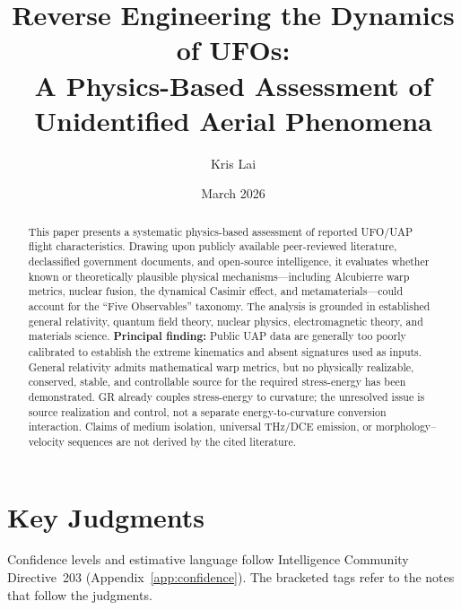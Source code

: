 \documentclass[aps,prd,twocolumn,superscriptaddress,nofootinbib,floatfix]{revtex4-2}
\begin{document}
\title{Reverse Engineering the Dynamics of UFOs:\texorpdfstring{\\}{ }
A Physics-Based Assessment of Unidentified Aerial Phenomena}

\author{Kris Lai}

\date{March 2026}

\begin{abstract}
This paper presents a systematic physics-based assessment of reported UFO/UAP
flight characteristics. Drawing upon publicly available peer-reviewed literature,
declassified government documents, and open-source intelligence, it evaluates
whether known or theoretically plausible physical mechanisms---including
Alcubierre warp metrics, nuclear fusion, the dynamical Casimir effect, and
metamaterials---could account for the ``Five Observables'' taxonomy. The analysis
is grounded in established general relativity, quantum field theory, nuclear
physics, electromagnetic theory, and materials science.
\textbf{Principal finding:} Public UAP data are generally too poorly calibrated to
establish the extreme kinematics and absent signatures used as inputs. General
relativity admits mathematical warp metrics, but no physically realizable,
conserved, stable, and controllable source for the required stress-energy has
been demonstrated. GR already couples stress-energy to curvature; the unresolved
issue is source realization and control, not a separate energy-to-curvature
conversion interaction. Claims of medium isolation, universal THz/DCE emission, or
morphology--velocity sequences are not derived by the cited literature.
\end{abstract}

\maketitle

\section*{Key Judgments}

Confidence levels and estimative language follow Intelligence Community
Directive~203 (Appendix~\ref{app:confidence}). The bracketed tags refer to the
notes that follow the judgments.
\end{document}
